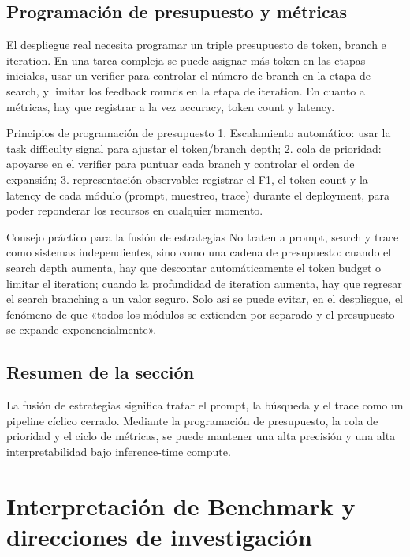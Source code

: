 \documentclass[a4paper]{article}
\begin{document}
\subsection{Programación de presupuesto y métricas}
El despliegue real necesita programar un triple presupuesto de token, branch e iteration. En una tarea compleja se puede asignar más token en las etapas iniciales, usar un verifier para controlar el número de branch en la etapa de search, y limitar los feedback rounds en la etapa de iteration. En cuanto a métricas, hay que registrar a la vez accuracy, token count y latency.

\begin{knowledgebox}{Principios de programación de presupuesto}
1. Escalamiento automático: usar la task difficulty signal para ajustar el token/branch depth; 2. cola de prioridad: apoyarse en el verifier para puntuar cada branch y controlar el orden de expansión; 3. representación observable: registrar el F1, el token count y la latency de cada módulo (prompt, muestreo, trace) durante el deployment, para poder reponderar los recursos en cualquier momento.
\end{knowledgebox}

\begin{importantbox}{Consejo práctico para la fusión de estrategias}
No traten a prompt, search y trace como sistemas independientes, sino como una cadena de presupuesto: cuando el search depth aumenta, hay que descontar automáticamente el token budget o limitar el iteration; cuando la profundidad de iteration aumenta, hay que regresar el search branching a un valor seguro. Solo así se puede evitar, en el despliegue, el fenómeno de que «todos los módulos se extienden por separado y el presupuesto se expande exponencialmente».
\end{importantbox}

\subsection{Resumen de la sección}
La fusión de estrategias significa tratar el prompt, la búsqueda y el trace como un pipeline cíclico cerrado. Mediante la programación de presupuesto, la cola de prioridad y el ciclo de métricas, se puede mantener una alta precisión y una alta interpretabilidad bajo inference-time compute.
\section{Interpretación de Benchmark y direcciones de investigación}
\end{document}
